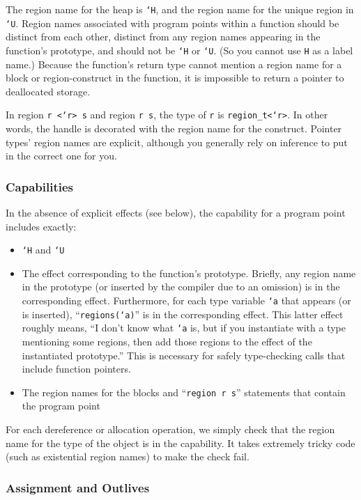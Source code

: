 The region name for the heap is \texttt{`H}, and the region name for the
unique region in \texttt{`U}.  Region names associated with program points
within a function should be distinct from each other, distinct from any
region names appearing in the function's prototype, and should not be
\texttt{`H} or \texttt{`U}.  (So you cannot use \texttt{H} as a label name.)
Because the function's return type cannot mention a region name for a block
or region-construct in the function, it is impossible to return a pointer to
deallocated storage.

In region \texttt{r <`r> s} and region \texttt{r s}, the type of
\texttt{r} is \texttt{region_t<`r>}.  In other words, the handle is
decorated with the region name for the construct.  Pointer types'
region names are explicit, although you generally rely on inference to
put in the correct one for you.

\subsubsection{Capabilities}

In the absence of explicit effects (see below), the capability for a
program point includes exactly:
\begin{itemize}
\item \texttt{`H} and \texttt{`U}
\item The effect corresponding to the function's prototype.  Briefly,
any region name in the prototype (or inserted by the compiler due to
an omission) is in the corresponding effect.  Furthermore, for each
type variable \texttt{`a} that appears (or is inserted),
``\texttt{regions(`a)}'' is in the corresponding effect.  This latter
effect roughly means, ``I don't know what \texttt{`a} is, but if you
instantiate with a type mentioning some regions, then add those
regions to the effect of the instantiated prototype.''  This is
necessary for safely type-checking calls that include function pointers.
\item The region names for the blocks and ``\texttt{region r s}''
  statements that contain the program point
\end{itemize}

For each dereference or allocation operation, we simply check that the
region name for the type of the object is in the capability.  It takes
extremely tricky code (such as existential region names) to make the
check fail.

\subsubsection{Assignment and Outlives}

